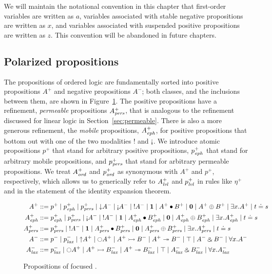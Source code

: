 We will maintain the notational convention in this chapter that
first-order variables are written as $a$, variables associated
with stable negative propositions are written as $x$, and variables
associated with suspended positive propositions are written as 
$z$. This convention will be abandoned in future chapters.

\subsection{Polarized propositions}

The propositions of ordered logic are fundamentally sorted into
positive propositions $A^+$ and negative propositions $A^-$; both
classes, and the inclusions between them, 
are shown in Figure~\ref{fig:ordered}. The
positive propositions have a refinement, {\it permeable} propositions
$A^+_{\it pers}$, that is analogous to the refinement discussed for linear
logic in Section~\ref{sec:permeable}. There is also a more generous
refinement, the {\it mobile} propositions, $A^+_{\it eph}$, for positive
propositions that bottom out with one of the two modalities ${!}$ and
${\gnab}$. We introduce atomic propositions $p^+$ that stand for
arbitrary positive propositions, $p^+_{\it eph}$ that stand for arbitrary
mobile propositions, and $p^+_{\it pers}$ that stand for arbitrary
permeable propositions. We treat $A^+_{\it ord}$ and $p^+_{\it ord}$ as synonymous
with $A^+$ and $p^+$, respectively, which allows us to generically
refer to $A^+_{\it lvl}$ and $p^+_{\it lvl}$ in rules like $\eta^+$ and in the
statement of the identity expansion theorem.

\begin{figure}
\begin{align*}
A^+ & ::= p^+ \mid p^+_\meph \mid p^+_\mpers
        \mid {\downarrow}A^- \mid {\gnab}A^- \mid {!}A^- 
        \mid \one \mid A^+ \fuse B^+ \mid \zero \mid A^+ \oplus B^+ 
        \mid \exists x. A^+ \mid t \doteq s
\\
A^+_\meph & ::= p^+_\meph \mid p^+_\mpers
        \mid {\gnab}A^- \mid {!}A^- 
        \mid \one \mid A^+_\meph \fuse B^+_\meph
        \mid \zero \mid A^+_\meph \oplus B^+_\meph
        \mid \exists x. A^+_\meph \mid t \doteq s
\\
A^+_\mpers & ::= p^+_\mpers 
        \mid {!}A^- 
        \mid \one \mid A^+_\mpers \fuse B^+_\mpers 
        \mid \zero \mid A^+_\mpers \oplus B^+_\mpers
        \mid \exists x. A^+_\mpers \mid t \doteq s
\\
A^- & ::= p^- \mid p^-_\mlax 
        \mid {\uparrow}A^+ \mid {\ocircle}A^+
        \mid A^+ \lefti B^- \mid A^+ \righti B^-
        \mid \top \mid A^- \with B^-
        \mid \forall x.A^-
\\
A^-_\mlax & ::= p^-_\mlax 
        \mid {\ocircle}A^+
        \mid A^+ \lefti B^-_\mlax \mid A^+ \righti B^-_\mlax
        \mid \top \mid A^-_\mlax \with B^-_\mlax
        \mid \forall x.A^-_\mlax
\end{align*}
\caption{Propositions of focused \ollll.}
\label{fig:ordered}
\end{figure}

